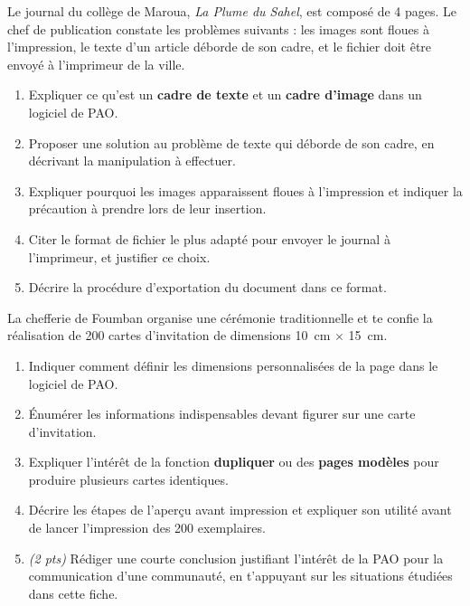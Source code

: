 \documentclass[11pt]{article}
\begin{document}
\begin{exercice}
Le journal du collège de Maroua, \textit{La Plume du Sahel}, est composé de 4 pages. Le chef de publication constate les problèmes suivants : les images sont floues à l'impression, le texte d'un article déborde de son cadre, et le fichier doit être envoyé à l'imprimeur de la ville.
\begin{enumerate}
  \item Expliquer ce qu'est un \textbf{cadre de texte} et un \textbf{cadre d'image} dans un logiciel de PAO.
  \item Proposer une solution au problème de texte qui déborde de son cadre, en décrivant la manipulation à effectuer.
  \item Expliquer pourquoi les images apparaissent floues à l'impression et indiquer la précaution à prendre lors de leur insertion.
  \item Citer le format de fichier le plus adapté pour envoyer le journal à l'imprimeur, et justifier ce choix.
  \item Décrire la procédure d'exportation du document dans ce format.
\end{enumerate}
\end{exercice}

\begin{exercice}
La chefferie de Foumban organise une cérémonie traditionnelle et te confie la réalisation de 200 cartes d'invitation de dimensions \SI{10}{cm} $\times$ \SI{15}{cm}.
\begin{enumerate}
  \item Indiquer comment définir les dimensions personnalisées de la page dans le logiciel de PAO.
  \item Énumérer les informations indispensables devant figurer sur une carte d'invitation.
  \item Expliquer l'intérêt de la fonction \textbf{dupliquer} ou des \textbf{pages modèles} pour produire plusieurs cartes identiques.
  \item Décrire les étapes de l'aperçu avant impression et expliquer son utilité avant de lancer l'impression des 200 exemplaires.
  \item \textit{(2 pts)} Rédiger une courte conclusion justifiant l'intérêt de la PAO pour la communication d'une communauté, en t'appuyant sur les situations étudiées dans cette fiche.
\end{enumerate}
\end{exercice}
\end{document}
